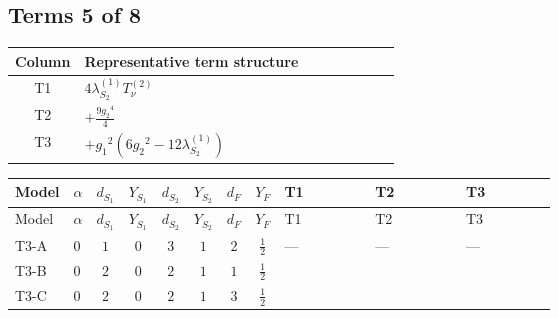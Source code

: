 \documentclass[8pt]{article}
\begin{document}
\begin{landscape}
\subsection*{Terms 5 of 8}
\begin{center}
\begin{tabular}{@{}c >{\raggedright\arraybackslash}p{0.82\linewidth}@{}}
\toprule
Column & Representative term structure \\
\midrule
T1 & \(\displaystyle 4 {\lambda_{S_2}^{(1)}} T_{\nu}^{(2)}\) \\
\midrule
T2 & \(\displaystyle +\frac{9 {g_2}^4}{4}\) \\
\midrule
T3 & \(\displaystyle +{g_1}^2 \left(6 {g_2}^2-12 {\lambda_{S_2}^{(1)}}\right)\) \\
\midrule
\bottomrule
\end{tabular}
\end{center}
\smallskip
\tiny
\begin{longtable}{@{}llcccccc >{\raggedright\arraybackslash}p{0.21\linewidth} >{\raggedright\arraybackslash}p{0.21\linewidth} >{\raggedright\arraybackslash}p{0.21\linewidth}@{}}
\toprule
Model & $\alpha$ & $d_{S_1}$ & $Y_{S_1}$ & $d_{S_2}$ & $Y_{S_2}$ & $d_F$ & $Y_F$ & T1 & T2 & T3 \\
\midrule
\endfirsthead
\toprule
Model & $\alpha$ & $d_{S_1}$ & $Y_{S_1}$ & $d_{S_2}$ & $Y_{S_2}$ & $d_F$ & $Y_F$ & T1 & T2 & T3 \\
\midrule
\endhead
T3-A & $0$ & $1$ & $0$ & $3$ & $1$ & $2$ & $\frac{1}{2}$ & --- & --- & --- \\
\midrule
T3-B & $0$ & $2$ & $0$ & $2$ & $1$ & $1$ & $\frac{1}{2}$ & \scriptsize\adjustbox{max width=\linewidth}{$\begin{gathered} 4 {\lambda_{S_2}^{(1)}} T_{\nu}^{(2)}\end{gathered}$} & \scriptsize\adjustbox{max width=\linewidth}{$\begin{gathered} +\frac{9 {g_2}^4}{4}\end{gathered}$} & \scriptsize\adjustbox{max width=\linewidth}{$\begin{gathered} +{g_1}^2 \left(6 {g_2}^2-12 {\lambda_{S_2}^{(1)}}\right)\end{gathered}$} \\
\midrule
T3-C & $0$ & $2$ & $0$ & $2$ & $1$ & $3$ & $\frac{1}{2}$ & \scriptsize\adjustbox{max width=\linewidth}{$\begin{gathered} 6 {\lambda_{S_2}^{(1)}} T_{\nu}^{(2)}\end{gathered}$} & \scriptsize\adjustbox{max width=\linewidth}{$\begin{gathered} +\frac{9 {g_2}^4}{4}\end{gathered}$} & \scriptsize\adjustbox{max width=\linewidth}{$\begin{gathered} +{g_1}^2 \left(6 {g_2}^2-12 {\lambda_{S_2}^{(1)}}\right)\end{gathered}$} \\

\end{longtable}
\end{landscape}
\end{document}

